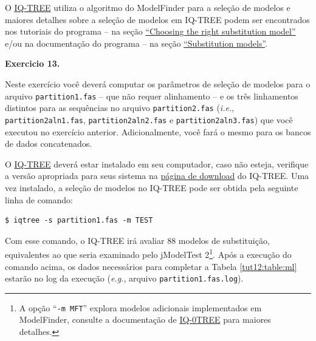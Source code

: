 \begin{refsection}
O \href{http://www.iqtree.org/}{IQ-TREE} utiliza o algoritmo do ModelFinder \parencite{kalyaanamoorthy_et_al_2017} para a seleção de modelos e maiores detalhes sobre a seleção de modelos em IQ-TREE podem ser encontrados nos tutoriais do programa -- na seção \href{http://www.iqtree.org/doc/Tutorial#choosing-the-right-substitution-model}{``Choosing the right substitution model''} e/ou na documentação do programa -- na seção \href{http://www.iqtree.org/doc/Substitution-Models}{``Substitution models''}.\\


\begin{blackBlock}{\textbf{Exercicio 13.}}\label{tut12:ex:13.6}

Neste exercício você deverá computar os parâmetros de seleção de modelos para o arquivo \texttt{partition1.fas} -- que não requer alinhamento -- e os três linhamentos distintos para as sequências no arquivo \texttt{partition2.fas} (\textit{i.e.}, \texttt{partition2aln1.fas}, \texttt{partition2aln2.fas} e \texttt{partition2aln3.fas}) que você executou no exercício anterior. Adicionalmente, você fará o mesmo para os bancos de dados concatenados.

\end{blackBlock}

\vspace{10pt}

O \href{http://www.iqtree.org/}{IQ-TREE} deverá estar instalado em seu computador, caso não esteja, verifique a versão apropriada para seus sistema na \href{http://www.iqtree.org/#download}{página de download} do IQ-TREE. Uma vez instalado, a seleção de modelos no IQ-TREE pode ser obtida pela seguinte linha de comando:

\begin{lstlisting}
$ iqtree -s partition1.fas -m TEST
\end{lstlisting}

Com esse comando, o IQ-TREE irá avaliar 88 modelos de substituição, equivalentes ao que seria examinado pelo jModelTest 2\footnote{ A opção ``\texttt{-m MFT}'' explora modelos adicionais implementados em ModelFinder, consulte a documentação de \href{http://www.iqtree.org/doc/Substitution-Models}{IQ-0TREE} para maiores detalhes.}. Após a execução do comando acima, os dados necessários para completar a Tabela \ref{tut12:table:ml} estarão no log da execução (\textit{e.g.}, arquivo \texttt{\texttt{partition1.fas.log}}).

\end{refsection}
